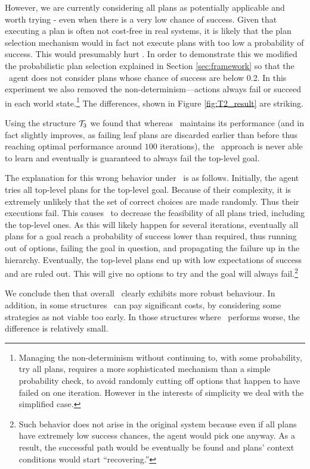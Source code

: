 However, we are currently considering all plans as potentially
applicable and worth trying - even when there is a very low chance of
success. Given that executing a plan is often not cost-free in real
systems, it is likely that the plan selection mechanism would in fact
not execute plans with too low a probability of success. This would
presumably hurt \CL.
% 
In order to demonstrate this we modified the probabilistic plan
selection explained in Section \ref{sec:framework} so that the \JACK\
agent does not consider plans whose chance of success are below 0.2.
In this experiment we also removed the non-determinism---actions
always fail or succeed in each world state.\footnote{Managing the
non-determinism without continuing to, with some probability, try all
plans, requires a more sophisticated mechanism than a simple
probability check, to avoid randomly cutting off options that happen
to have failed on one iteration. However in the interests of
simplicity we deal with the simplified case.}
%
The differences, shown in Figure \ref{fig:T2_result} are striking.

Using the structure 
${\mathcal{T}}_3$ we  found that whereas \BUL\ maintains its performance (and in
fact slightly improves, as failing leaf plans are discarded earlier
than before thus reaching optimal performance around $100$
iterations), the \CL\ approach is never able to learn and eventually
is guaranteed to always fail the top-level goal.

The explanation for this wrong behavior under \CL\ is as
follows. Initially, the agent tries all top-level plans for the
top-level goal. Because of their complexity, it is extremely unlikely
that the set of correct choices are made randomly. Thus their
executions fail.
This causes \CL\ to decrease the feasibility of all plans
tried, including the top-level ones. As this will likely happen
for several iterations, eventually all plans for a goal reach a probability of
success lower than required, thus
running out of options, failing the goal in question, and propagating
the failure up in the hierarchy. Eventually, the top-level plans end
up with low expectations of success and are ruled out.
This will give no options to try and the goal will always
fail.\footnote{Such behavior does not arise in the original
system because even if all plans have extremely low success chances,
the agent would pick one anyway. As a result, the successful path
would be eventually be found and plans' context conditions would start
``recovering.''}

We conclude then that overall \BUL\ clearly exhibits more robust
behaviour. In addition, in some structures \CL\ can pay significant
costs, by considering some strategies as not viable too early. In
those structures where \BUL\ performs worse, the difference is
relatively small. 



